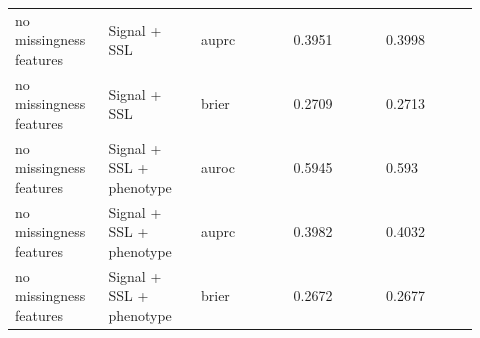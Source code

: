 \documentclass[11pt]{article}
\begin{document}
\begin{landscape}
\begin{longtable}{L{0.184\linewidth} L{0.184\linewidth} L{0.184\linewidth} L{0.184\linewidth} L{0.184\linewidth}}
no missingness features & Signal + SSL & auprc & 0.\allowbreak{}3951 & 0.\allowbreak{}3998 \\
no missingness features & Signal + SSL & brier & 0.\allowbreak{}2709 & 0.\allowbreak{}2713 \\
no missingness features & Signal + SSL + phenotype & auroc & 0.\allowbreak{}5945 & 0.\allowbreak{}593 \\
no missingness features & Signal + SSL + phenotype & auprc & 0.\allowbreak{}3982 & 0.\allowbreak{}4032 \\
no missingness features & Signal + SSL + phenotype & brier & 0.\allowbreak{}2672 & 0.\allowbreak{}2677 \\
\end{longtable}
\normalsize
\end{landscape}
\end{document}
